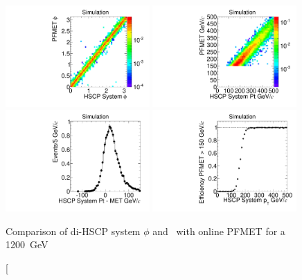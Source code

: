 \begin{figure}
  \begin{center}
      \includegraphics[clip=false, trim=0.0cm 0cm 0.0cm 0cm, width=0.49\textwidth]{figures/search/Gluino_8TeV_M1200N_f10SystPhiMET}
      \includegraphics[clip=false, trim=0.0cm 0cm 0.0cm 0cm, width=0.49\textwidth]{figures/search/Gluino_8TeV_M1200N_f10SystPtMET} \\
      \includegraphics[clip=false, trim=0.0cm 0cm 0.0cm 0cm, width=0.49\textwidth]{figures/search/Gluino_8TeV_M1200N_f10SystPtDiffMET}
      \includegraphics[clip=false, trim=0.0cm 0cm 0.0cm 0cm, width=0.49\textwidth]{figures/search/Gluino_8TeV_M1200N_f10SystPtEff}
      \caption[Comparison of di-HSCP system $\phi$ and \pt\ with online PFMET for a 1200~GeV

\end{center}
\end{figure}
